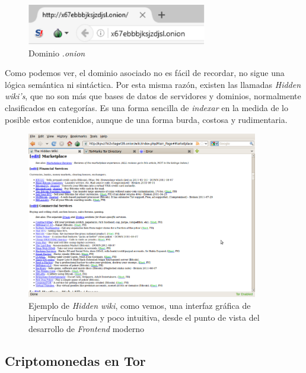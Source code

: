 \documentclass[a4paper, 11pt, titlepage]{article}
\begin{document}
            \begin{figure}[htp]
                \centering
                \includegraphics[width=0.7\textwidth]{resources/hiddenservice00.png}
                \caption{Dominio \emph{.onion}}
                \label{onion}
            \end{figure}

            Como podemos ver, el dominio asociado no es fácil de recordar, no sigue una lógica semántica ni sintáctica. 
            Por esta misma razón, existen las llamadas \emph{Hidden wiki's}, que no son más que bases de datos de servidores 
            y dominios, normalmente clasificados en categorías. Es una forma sencilla de \emph{indexar} en la medida de lo 
            posible estos contenidos, aunque de una forma burda, costosa y rudimentaria.

            \begin{figure}[htp]
                \centering
                \includegraphics[width=0.9\textwidth]{resources/hiddenservice01.png}
                \caption{Ejemplo de \emph{Hidden wiki}, como vemos, una interfaz gráfica de hipervínculo burda y poco intuitiva, 
                    desde el punto de vista del desarrollo de \emph{Frontend} moderno}
                \label{}
            \end{figure}

    \subsection{Criptomonedas en Tor} 
\end{document}
